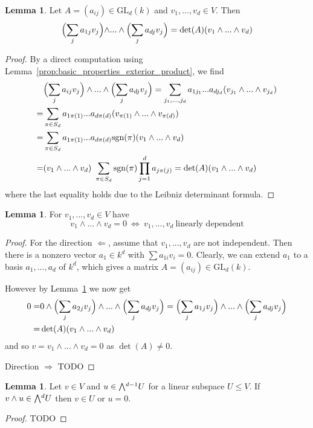 \documentclass{scrartcl}
\newcommand{\GL}{\mathrm{GL}}
\newcommand{\sgn}{\mathrm{sgn}}
\newcommand{\extpow}{\mathchoice{{\textstyle\bigwedge}}
    {{\bigwedge}}
    {{\textstyle\wedge}}
    {{\scriptstyle\wedge}}}
\theoremstyle{definition}
\newtheorem{lemma}[subsection]{Lemma}
\begin{document}
\begin{lemma}
    \label{prop:linear_transform_extpow}
    Let $A = (a_{ij}) \in \GL_d(k)$ and $v_1, ..., v_d \in V$.
    Then
    \begin{equation*}
        \Bigl( \sum_j a_{1j}v_j \Bigl) \wedge ... \wedge \Bigl( \sum_{j} a_{dj} v_j \Bigr) = \det(A) (v_1 \wedge ... \wedge v_d)
    \end{equation*}
\end{lemma}
\begin{proof}
    By a direct computation using Lemma~\ref{prop:basic_properties_exterior_product}, we find
    \begin{align*}
        &\Bigl( \sum_j a_{ij} v_j \Bigr) \wedge ... \wedge \Bigl( \sum_j a_{dj} v_j \Bigr) = \sum_{j_1, ..., j_d} a_{1j_1} ... a_{dj_d} (v_{j_1} \wedge ... \wedge v_{j_d}) \\
        = &\sum_{\pi \in S_d} a_{1\pi(1)} ... a_{d\pi(d)} (v_{\pi(1)} \wedge ... \wedge v_{\pi(d)}) \\
        = &\sum_{\pi \in S_d} a_{1\pi(1)} ... a_{d\pi(d)} \sgn(\pi) (v_1 \wedge ... \wedge v_d) \\
        = &(v_1 \wedge ... \wedge v_d) \ \sum_{\pi \in S_d} \sgn(\pi) \prod_{j = 1}^d a_{j\pi(j)} = \det(A) (v_1 \wedge ... \wedge v_d)
    \end{align*}
    where the last equality holds due to the Leibniz determinant formula.
\end{proof}
\begin{lemma}
    \label{prop:extpow_zero_iff_independent}
    For $v_1, ..., v_d \in V$ have
    \begin{equation*}
        v_1 \wedge ... \wedge v_d = 0 \ \Leftrightarrow \ v_1, ..., v_d \ \text{linearly dependent}
    \end{equation*}
\end{lemma}
\begin{proof}
    For the direction $\Leftarrow$, assume that $v_1, ..., v_d$ are not independent. 
    Then there is a nonzero vector $a_1 \in k^d$ with $\sum a_{1i} v_i = 0$.
    Clearly, we can extend $a_1$ to a basis $a_1, ..., a_d$ of $k^d$, which gives a matrix $A = (a_{ij}) \in \GL_d(k)$.

    However by Lemma~\ref{prop:linear_transform_extpow} we now get
    \begin{align*}
        0 =& 0 \wedge \Bigl( \sum_j a_{2j} v_j \Bigr) \wedge ... \wedge \Bigl( \sum_j a_{dj} v_j \Bigr) = \Bigl( \sum_j a_{1j} v_j \Bigr) \wedge ... \wedge \Bigl( \sum_j a_{dj} v_j \Bigr) \\
        =& \det(A) (v_1 \wedge ... \wedge v_d)
    \end{align*}
    and so $v = v_1 \wedge ... \wedge v_d = 0$ as $\det(A) \neq 0$.

    Direction $\Rightarrow$ TODO
\end{proof}
\begin{lemma}
    \label{prop:subspace_closed}
    Let $v \in V$ and $u \in \extpow^{d - 1} U$ for a linear subspace $U \leq V$. 
    If $v \wedge u \in \extpow^d U$ then $v \in U$ or $u = 0$.
\end{lemma}
\begin{proof}
    TODO
\end{proof}
\end{document}
